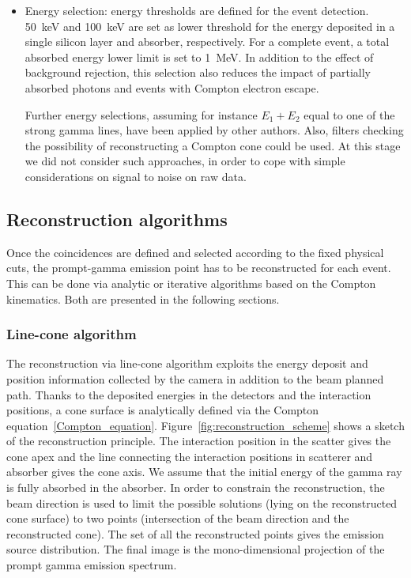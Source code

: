 \begin{itemize}
\item Energy selection: energy thresholds are defined for the event detection. 50~keV and 100~keV are set as lower threshold for the energy deposited in a single silicon layer and absorber, respectively. For a complete event, a total absorbed energy lower limit is set to 1~MeV. In addition to the effect of background rejection, this selection also reduces the impact of partially absorbed photons and events with Compton electron escape.

Further energy selections, assuming for instance $E_1+E_2$ equal to one of the strong gamma lines, have been applied by other authors. Also, filters checking the possibility of reconstructing a Compton cone could be used. At this stage we did not consider such approaches, in order to cope with simple considerations on signal to noise on raw data.

\end{itemize}

\subsection{Reconstruction algorithms}
\label{MatMeth:reconstruction}
Once the coincidences are defined and selected according to the fixed physical cuts, the prompt-gamma emission point has to be reconstructed for each event. This can be done via analytic or iterative algorithms based on the Compton kinematics. Both are presented in the following sections.


\subsubsection{Line-cone algorithm}
The reconstruction via line-cone algorithm exploits the energy deposit and position information collected by the camera in addition to the beam planned path. Thanks to the deposited energies in the detectors and the interaction positions, a cone surface is analytically defined via the Compton equation~\ref{Compton_equation}. Figure~\ref{fig:reconstruction_scheme} shows a sketch of the reconstruction principle. The interaction position in the scatter gives the cone apex and the line connecting the interaction positions in scatterer and absorber gives the cone axis. We assume that the initial energy of the gamma ray is fully absorbed in the absorber. In order to constrain the reconstruction, the beam direction is used to limit the possible solutions (lying on the reconstructed cone surface) to two points (intersection of the beam direction and the reconstructed cone). The set of all the reconstructed points gives the emission source distribution. The final image is the mono-dimensional projection of the prompt gamma emission spectrum. 

